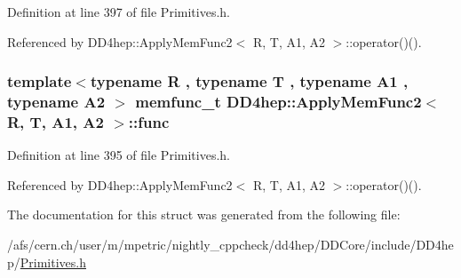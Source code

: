 Definition at line 397 of file Primitives.h.

Referenced by DD4hep::ApplyMemFunc2$<$ R, T, A1, A2 $>$::operator()().\hypertarget{struct_d_d4hep_1_1_apply_mem_func2_a7fc130521dd8099937693fdf25eaaaaf}{
\subsubsection[{func}]{\setlength{\rightskip}{0pt plus 5cm}template$<$typename R , typename T , typename A1 , typename A2 $>$ {\bf memfunc\_\-t} {\bf DD4hep::ApplyMemFunc2}$<$ R, {\bf T}, A1, A2 $>$::{\bf func}}}
\label{struct_d_d4hep_1_1_apply_mem_func2_a7fc130521dd8099937693fdf25eaaaaf}


Definition at line 395 of file Primitives.h.

Referenced by DD4hep::ApplyMemFunc2$<$ R, T, A1, A2 $>$::operator()().

The documentation for this struct was generated from the following file:\begin{DoxyCompactItemize}
\item 
/afs/cern.ch/user/m/mpetric/nightly\_\-cppcheck/dd4hep/DDCore/include/DD4hep/\hyperlink{_primitives_8h}{Primitives.h}\end{DoxyCompactItemize}
